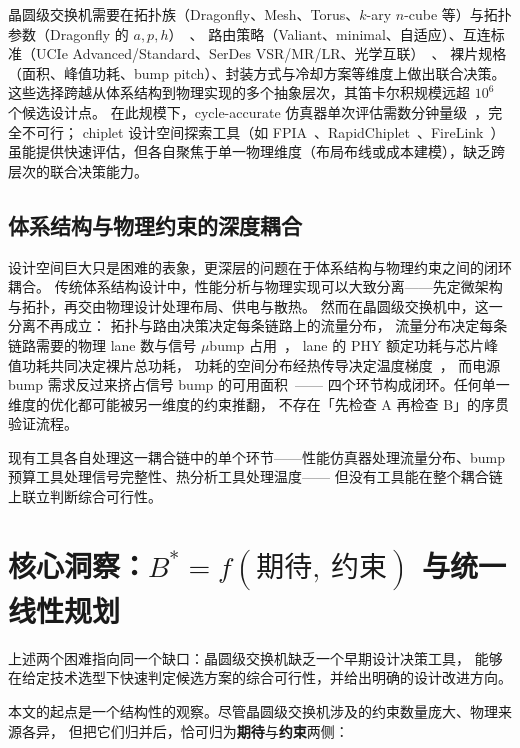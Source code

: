晶圆级交换机需要在拓扑族（Dragonfly、Mesh、Torus、$k$-ary $n$-cube 等）与拓扑参数（Dragonfly 的 $a,p,h$）~\cite{kim2008technology}、
路由策略（Valiant、minimal、自适应）、互连标准（UCIe Advanced/Standard、SerDes VSR/MR/LR、光学互联）~\cite{ucie2.0-2024,oif-cei-5.1}、
裸片规格（面积、峰值功耗、bump pitch）、封装方式与冷却方案等维度上做出联合决策。
这些选择跨越从体系结构到物理实现的多个抽象层次，其笛卡尔积规模远超 $10^6$ 个候选设计点。
在此规模下，cycle-accurate 仿真器单次评估需数分钟量级~\cite{dally2004principles}，完全不可行；
chiplet 设计空间探索工具（如 FPIA~\cite{jiao2024fpia}、RapidChiplet~\cite{iff2025rapidchiplet}、FireLink~\cite{li2025firelink}）
虽能提供快速评估，但各自聚焦于单一物理维度（布局布线或成本建模），缺乏跨层次的联合决策能力。

\subsection{体系结构与物理约束的深度耦合}\label{sec:intro-coupling}

设计空间巨大只是困难的表象，更深层的问题在于体系结构与物理约束之间的闭环耦合。
传统体系结构设计中，性能分析与物理实现可以大致分离——先定微架构与拓扑，再交由物理设计处理布局、供电与散热。
然而在晶圆级交换机中，这一分离不再成立：
拓扑与路由决策决定每条链路上的流量分布，
流量分布决定每条链路需要的物理 lane 数与信号 $\mu$bump 占用~\cite{ucie2.0-2024}，
lane 的 PHY 额定功耗与芯片峰值功耗共同决定裸片总功耗，
功耗的空间分布经热传导决定温度梯度~\cite{mfit2025}，
而电源 bump 需求反过来挤占信号 bump 的可用面积~\cite{electrical-thermal-chiplet2024}——
四个环节构成闭环。任何单一维度的优化都可能被另一维度的约束推翻，
不存在「先检查 A 再检查 B」的序贯验证流程。

现有工具各自处理这一耦合链中的单个环节——性能仿真器处理流量分布、bump 预算工具处理信号完整性、热分析工具处理温度——
但没有工具能在整个耦合链上联立判断综合可行性。

\section{核心洞察：$B^* = f(\text{期待},\ \text{约束})$ 与统一线性规划}\label{sec:intro-insight}

上述两个困难指向同一个缺口：晶圆级交换机缺乏一个早期设计决策工具，
能够在给定技术选型下快速判定候选方案的综合可行性，并给出明确的设计改进方向。

本文的起点是一个结构性的观察。尽管晶圆级交换机涉及的约束数量庞大、物理来源各异，
但把它们归并后，恰可归为\textbf{期待}与\textbf{约束}两侧：

